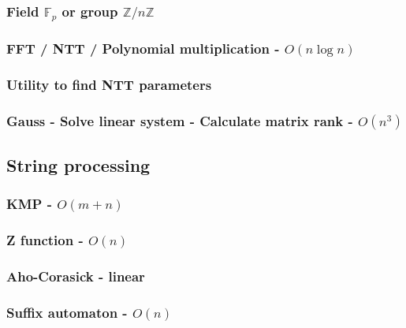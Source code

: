 \documentclass[landscape,a4paper,twocolumn,10pt]{report}
\begin{document}
\subsubsection{Field $\mathbb F_p$ or group $\mathbb Z/n\mathbb Z$}


\subsubsection{FFT / NTT / Polynomial multiplication - $O(n \log n)$}


\subsubsection{Utility to find NTT parameters}


\subsubsection{Gauss - Solve linear system - Calculate matrix rank - $O(n^3)$}



\subsection*{String processing}
\label{string}

\subsubsection{KMP - $O(m+n)$}


\subsubsection{Z function - $O(n)$}


\subsubsection{Aho-Corasick - linear}


\subsubsection{Suffix automaton - $O(n)$}

\end{document}
